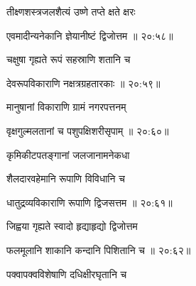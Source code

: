 {\devanagarifont तीक्ष्णशस्त्रजलशैत्यं उष्णे तप्ते क्षते क्षरः \thinspace{\dandab} \dontdisplaylinenum }%


{\devanagarifont एवमादीन्यनेकानि ज्ञेयानीष्टं द्विजोत्तम {॥ २०:५८॥} \veg\dontdisplaylinenum }%
 


{\devanagarifont चक्षुषा गृह्यते रूपं सहस्राणि शतानि च \thinspace{\dandab} \dontdisplaylinenum }%
 

{\devanagarifont देवरूपविकाराणि नक्षत्रग्रहतारकाः {॥ २०:५९॥} \veg\dontdisplaylinenum }%
 
{\devanagarifont मानुषानां विकाराणि ग्रामं नगरपत्तनम् \thinspace{\dandab} \dontdisplaylinenum }%
 

{\devanagarifont वृक्षगुल्मलतानां च पशुपक्षिशरीसृपाम् {॥ २०:६०॥} \veg\dontdisplaylinenum }%
 
{\devanagarifont कृमिकीटपतङ्गानां जलजानामनेकधा \thinspace{\dandab} \dontdisplaylinenum }%
 
{\devanagarifont शैलदारवहेमानि रूपाणि विविधानि च  \danda\dontdisplaylinenum }%


{\devanagarifont धातुद्रव्यविकाराणि रूपाणि द्विजसत्तम {॥ २०:६१॥} \veg\dontdisplaylinenum }%



{\devanagarifont जिह्वया गृह्यते स्वादो हृद्याहृद्यो द्विजोत्तम \thinspace{\dandab} \dontdisplaylinenum }%


{\devanagarifont फलमूलानि शाकानि कन्दानि पिशितानि च {॥ २०:६२॥} \veg\dontdisplaylinenum }%
 
{\devanagarifont पक्वापक्वविशेषाणि दधिक्षीरघृतानि च \thinspace{\dandab} \dontdisplaylinenum }%
 
